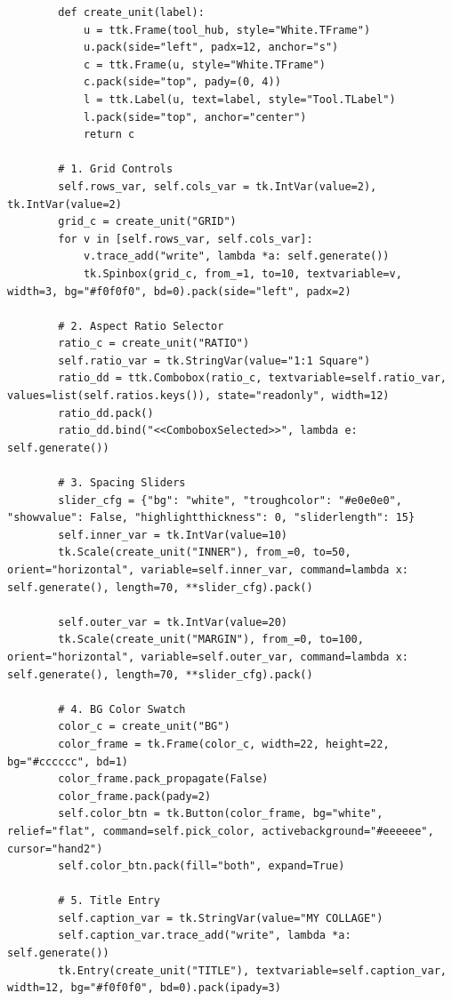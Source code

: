 \documentclass[a4paper]{article}
\begin{document}
\begin{verbatim}
        def create_unit(label):
            u = ttk.Frame(tool_hub, style="White.TFrame")
            u.pack(side="left", padx=12, anchor="s") 
            c = ttk.Frame(u, style="White.TFrame")
            c.pack(side="top", pady=(0, 4)) 
            l = ttk.Label(u, text=label, style="Tool.TLabel")
            l.pack(side="top", anchor="center")
            return c

        # 1. Grid Controls
        self.rows_var, self.cols_var = tk.IntVar(value=2), tk.IntVar(value=2)
        grid_c = create_unit("GRID")
        for v in [self.rows_var, self.cols_var]:
            v.trace_add("write", lambda *a: self.generate())
            tk.Spinbox(grid_c, from_=1, to=10, textvariable=v, width=3, bg="#f0f0f0", bd=0).pack(side="left", padx=2)

        # 2. Aspect Ratio Selector
        ratio_c = create_unit("RATIO")
        self.ratio_var = tk.StringVar(value="1:1 Square")
        ratio_dd = ttk.Combobox(ratio_c, textvariable=self.ratio_var, values=list(self.ratios.keys()), state="readonly", width=12)
        ratio_dd.pack()
        ratio_dd.bind("<<ComboboxSelected>>", lambda e: self.generate())

        # 3. Spacing Sliders
        slider_cfg = {"bg": "white", "troughcolor": "#e0e0e0", "showvalue": False, "highlightthickness": 0, "sliderlength": 15}
        self.inner_var = tk.IntVar(value=10)
        tk.Scale(create_unit("INNER"), from_=0, to=50, orient="horizontal", variable=self.inner_var, command=lambda x: self.generate(), length=70, **slider_cfg).pack()

        self.outer_var = tk.IntVar(value=20)
        tk.Scale(create_unit("MARGIN"), from_=0, to=100, orient="horizontal", variable=self.outer_var, command=lambda x: self.generate(), length=70, **slider_cfg).pack()

        # 4. BG Color Swatch
        color_c = create_unit("BG")
        color_frame = tk.Frame(color_c, width=22, height=22, bg="#cccccc", bd=1)
        color_frame.pack_propagate(False)
        color_frame.pack(pady=2)
        self.color_btn = tk.Button(color_frame, bg="white", relief="flat", command=self.pick_color, activebackground="#eeeeee", cursor="hand2")
        self.color_btn.pack(fill="both", expand=True)

        # 5. Title Entry
        self.caption_var = tk.StringVar(value="MY COLLAGE")
        self.caption_var.trace_add("write", lambda *a: self.generate())
        tk.Entry(create_unit("TITLE"), textvariable=self.caption_var, width=12, bg="#f0f0f0", bd=0).pack(ipady=3)


\end{verbatim}
\end{document}
